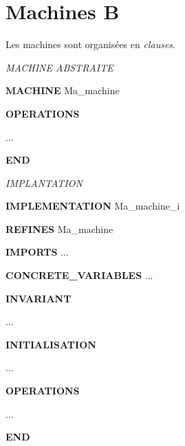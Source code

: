 \documentclass[10pt]{beamer}
\begin{document}
\section{Machines B}
\frame{\sectionpage}
\begin{frame}

Les machines sont organisées en \emph{clauses}.
\setlength{\columnseprule}{0.05cm}
\begin{scriptsize}
\begin{multicols}{2}
\begin{center}\emph{MACHINE ABSTRAITE}\end{center}
\begin{semiverbatim}
\textbf{MACHINE} Ma\_machine


\textbf{OPERATIONS}

 ...

\textbf{END}
\end{semiverbatim}

\columnbreak
\begin{center}\emph{IMPLANTATION}\end{center}
\begin{semiverbatim}
\textbf{IMPLEMENTATION} Ma\_machine\_i

\textbf{REFINES} Ma\_machine

\textbf{IMPORTS} ...

\textbf{CONCRETE\_VARIABLES} ...

\textbf{INVARIANT}

  ...

\textbf{INITIALISATION}

  ...\uncover<2->{\emph{Substitutions}}

\textbf{OPERATIONS}

  ...

\textbf{END}
\end{semiverbatim}
\end{multicols}
\end{scriptsize}


\end{frame}


\end{document}
